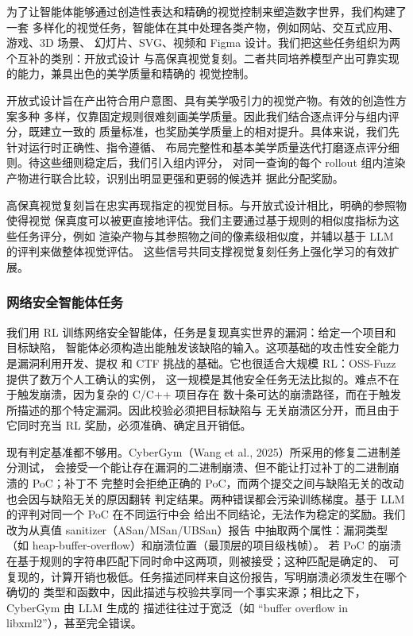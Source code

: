 \documentclass[
  10
]{article}
\begin{document}
为了让智能体能够通过创造性表达和精确的视觉控制来塑造数字世界，我们构建了一套
多样化的视觉任务，智能体在其中处理各类产物，例如网站、交互式应用、游戏、3D 场景、
幻灯片、SVG、视频和 Figma 设计。我们把这些任务组织为两个互补的类别：开放式设计
与高保真视觉复刻。二者共同培养模型产出可靠实现的能力，兼具出色的美学质量和精确的
视觉控制。

开放式设计旨在产出符合用户意图、具有美学吸引力的视觉产物。有效的创造性方案多种
多样，仅靠固定规则很难刻画美学质量。因此我们结合逐点评分与组内评分，既建立一致的
质量标准，也奖励美学质量上的相对提升。具体来说，我们先针对运行时正确性、指令遵循、
布局完整性和基本美学质量迭代打磨逐点评分细则。待这些细则稳定后，我们引入组内评分，
对同一查询的每个 rollout 组内渲染产物进行联合比较，识别出明显更强和更弱的候选并
据此分配奖励。

高保真视觉复刻旨在忠实再现指定的视觉目标。与开放式设计相比，明确的参照物使得视觉
保真度可以被更直接地评估。我们主要通过基于规则的相似度指标为这些任务评分，例如
渲染产物与其参照物之间的像素级相似度，并辅以基于 LLM 的评判来做整体视觉评估。
这些信号共同支撑视觉复刻任务上强化学习的有效扩展。

\subsubsection{网络安全智能体任务}\label{cybersecurity-agent-tasks}

我们用 RL 训练网络安全智能体，任务是复现真实世界的漏洞：给定一个项目和目标缺陷，
智能体必须构造出能触发该缺陷的输入。这项基础的攻击性安全能力是漏洞利用开发、提权
和 CTF 挑战的基础。它也很适合大规模 RL：OSS-Fuzz 提供了数万个人工确认的实例，
这一规模是其他安全任务无法比拟的。难点不在于触发崩溃，因为复杂的 C/C++ 项目存在
数十条可达的崩溃路径，而在于触发所描述的那个特定漏洞。因此校验必须把目标缺陷与
无关崩溃区分开，而且由于它同时充当 RL 奖励，必须准确、确定且开销低。

现有判定基准都不够用。CyberGym（Wang et al., 2025）所采用的修复二进制差分测试，
会接受一个能让存在漏洞的二进制崩溃、但不能让打过补丁的二进制崩溃的 PoC；补丁不
完整时会拒绝正确的 PoC，而两个提交之间与缺陷无关的改动也会因与缺陷无关的原因翻转
判定结果。两种错误都会污染训练梯度。基于 LLM 的评判对同一个 PoC 在不同运行中会
给出不同结论，无法作为稳定的奖励。我们改为从真值 sanitizer（ASan/MSan/UBSan）报告
中抽取两个属性：漏洞类型（如 heap-buffer-overflow）和崩溃位置（最顶层的项目级栈帧）。
若 PoC 的崩溃在基于规则的字符串匹配下同时命中这两项，则被接受；这种匹配是确定的、
可复现的，计算开销也极低。任务描述同样来自这份报告，写明崩溃必须发生在哪个确切的
类型和函数中，因此描述与校验共享同一个事实来源；相比之下，CyberGym 由 LLM 生成的
描述往往过于宽泛（如 ``buffer overflow in libxml2''），甚至完全错误。
\end{document}

